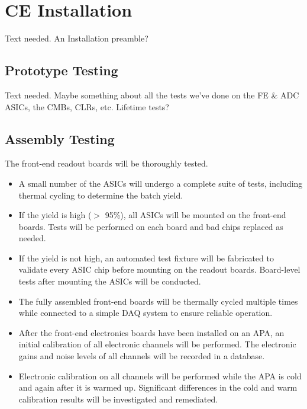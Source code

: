 %
\section{CE Installation}
\label{sec:ce_install}

\begin{editornote}
  Text needed. An Installation preamble?
\end{editornote}

\subsection{Prototype Testing}
\label{sec:ce_install_proto}

\begin{editornote}
  Text needed. Maybe something about all the tests we've done on the FE \& ADC ASICs, the CMBs, CLRs, etc.
  Lifetime tests?
\end{editornote}

\subsection{Assembly Testing}
\label{sec:ce_install_assembly}

The front-end readout boards will be thoroughly tested.
\begin{itemize}
\item A small number of the ASICs will undergo a complete suite 
of tests, including thermal cycling to determine the batch yield.
\item If the yield is high ($>$ 95\%), all ASICs will be mounted 
on the front-end boards.
Tests will be performed on each board and bad chips replaced as needed.
\item If the yield is not high, an automated test fixture will be 
fabricated to validate every ASIC chip before mounting on the readout boards.
Board-level tests after mounting the ASICs will be conducted.
\item The fully assembled front-end boards will be thermally cycled multiple times while connected
to a simple DAQ system to ensure reliable operation.
\item After the front-end electronics boards have been installed on an APA,
an initial calibration of all electronic channels will be performed.
The electronic gains and noise levels of all channels will be recorded in a database.
\item Electronic calibration on all channels will be performed while the APA is cold and again after it is warmed up.
Significant differences in the cold and warm calibration results will be investigated and remediated.  
\end{itemize}

